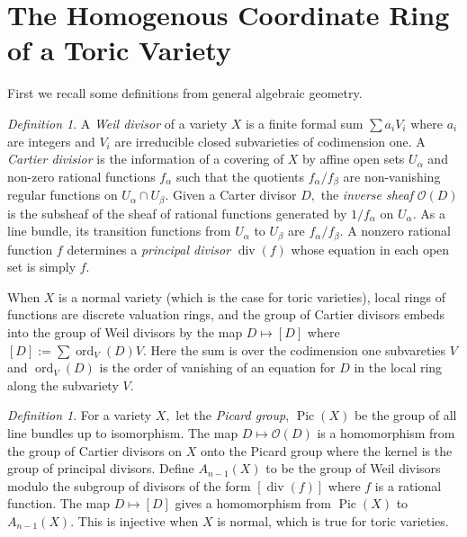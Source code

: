 \documentclass[BSc]{usydthesis}
\numberwithin{equation}{chapter}
\theoremstyle{remark}
\newtheorem{Definition}[equation]{Definition}
\begin{document}
\section{The Homogenous Coordinate Ring of a Toric Variety}


First we recall some definitions from general algebraic geometry. 

\begin{Definition}
 A {\em Weil divisor} of a variety $X$ is a finite formal sum $\sum a_i V_i$ where $a_i$ are integers and $V_i$ are irreducible closed subvarieties of codimension one. A {\em Cartier divisior} is the information of a covering of $X$ by affine open sets $U_{\alpha}$ and non-zero rational functions $f_{\alpha}$ such that the quotients $f_{\alpha}/f_{\beta}$ are non-vanishing regular functions on $U_{\alpha}\cap U_{\beta}.$ Given a Carter divisor $D,$ the {\em inverse sheaf} $\mathcal{O}(D)$ is the subsheaf of the sheaf of rational functions generated by $1/f_{\alpha}$ on $U_{\alpha}.$ As a line bundle, its transition functions from $U_{\alpha}$ to $U_{\beta}$ are $f_{\alpha}/f_{\beta}.$ A nonzero rational function $f$ determines a {\em principal divisor} $\operatorname{div}(f)$ whose equation in each open set is simply $f.$ 
\end{Definition}

When $X$ is a normal variety (which is the case for toric varieties), local rings of functions are discrete valuation rings, and the group of Cartier divisors embeds into the group of Weil divisors by the map $D\mapsto [D]$ where $[D]:= \sum \operatorname{ord}_V (D) V.$ Here the sum is over the codimension one subvareties $V$ and $\operatorname{ord}_V(D)$ is the order of vanishing of an equation for $D$ in the local ring along the subvariety $V.$ 

\begin{Definition}
 For a variety $X,$ let the {\em Picard group}, $\operatorname{Pic}(X)$ be the group of all line bundles up to isomorphism. The map $D \mapsto \mathcal{O}(D)$ is a homomorphism from the group of Cartier divisors on $X$ onto the Picard group where the kernel is the group of principal divisors. Define $A_{n-1}(X)$ to be the group of Weil divisors modulo the subgroup of divisors of the form $[ \operatorname{div}(f) ]$ where $f$ is a rational function. The map $D\mapsto [D]$ gives a homomorphism from $\operatorname{Pic}(X)$ to $A_{n-1}(X).$ This is injective when $X$ is normal, which is true for toric varieties. 
\end{Definition}
\end{document}
